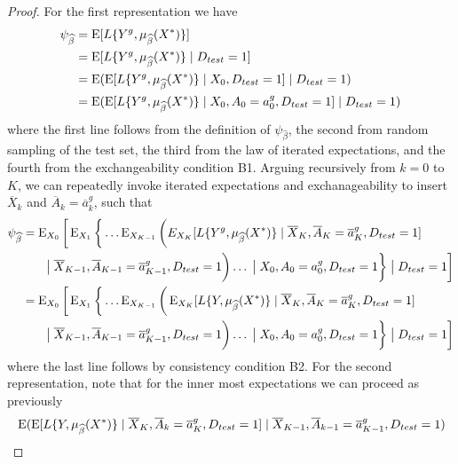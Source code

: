 \begin{proof}
    For the first representation we have 
    \begin{align*}
        \psi_{\widehat{\beta}} &= \operatorname{E}[L\{Y^{g}, \mu_{\widehat{\beta}}(X^*)\}] \\
        & = \operatorname{E}[L\{Y^{g}, \mu_{\widehat{\beta}}(X^*)\}\mid D_{test} = 1] \\
        & = \operatorname{E}(\operatorname{E}[L\{Y^{g}, \mu_{\widehat{\beta}}(X^*)\}\mid X_0, D_{test} = 1] \mid D_{test} = 1) \\
        & = \operatorname{E}(\operatorname{E}[L\{Y^{g}, \mu_{\widehat{\beta}}(X^*)\}\mid X_0, A_0 = a^g_0, D_{test} = 1] \mid D_{test} = 1) 
    \end{align*}
    where the first line follows from the definition of $\psi_{\widehat{\beta}}$, the second from random sampling of the test set, the third from the law of iterated expectations, and the fourth from the exchangeability condition B1. Arguing recursively from $k = 0$ to $K$, we can repeatedly invoke iterated expectations and exchanageability to insert $\overline{X}_k$ and $\overline{A}_k = \overline{a}^g_k$, such that
    \begin{align*}
        \psi_{\widehat{\beta}} &= \operatorname{E}_{X_0}\bigg[\operatorname{E}_{X_1}\bigg\{\ldots \operatorname{E}_{X_{K-1}}\bigg(E_{X_{K}}[L\{Y^g, \mu_{\widehat{\beta}}(X^*)\} \mid \overline{X}_K, \overline{A}_K=\overline{a}^g_K, D_{test} = 1] \\
        & \qquad \big\vert\; \overline{X}_{K-1}, \overline{A}_{K-1}=\overline{a}^g_{K-1}, D_{test} = 1\bigg) \ldots \;\big\vert\; X_{0}, A_{0}=a^g_{0}, D_{test} = 1\bigg\}\;\big\vert\; D_{test} = 1\bigg]\\
        &= \operatorname{E}_{X_0}\bigg[\operatorname{E}_{X_1}\bigg\{\ldots \operatorname{E}_{X_{K-1}}\bigg(\operatorname{E}_{X_{K}}[L\{Y, \mu_{\widehat{\beta}}(X^*)\} \mid \overline{X}_K, \overline{A}_K=\overline{a}^g_K, D_{test} = 1] \\
        & \qquad \big\vert\; \overline{X}_{K-1}, \overline{A}_{K-1}=\overline{a}^g_{K-1}, D_{test} = 1\bigg) \ldots \;\big\vert\; X_{0}, A_{0}=a^g_{0}, D_{test} = 1\bigg\}\;\big\vert\; D_{test} = 1\bigg]
    \end{align*}
    where the last line follows by consistency condition B2. For the second representation, note that for the inner most expectations we can proceed as previously
    \begin{align*}
        & \E(\E[L\{Y, \mu_{\widehat{\beta}}(X^*)\} \mid \overline{X}_K, \overline{A}_k=\overline{a}^g_K, D_{test} = 1] \mid \overline{X}_{K-1}, \overline{A}_{k-1}=\overline{a}^g_{K-1}, D_{test} = 1) \\

\end{align*}
\end{proof}

